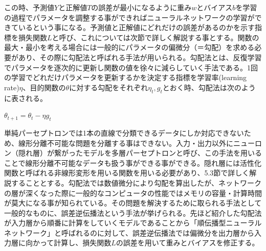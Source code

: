 \documentclass{article}
\begin{document}
この時、予測値\begin{math}Y\end{math}と正解値\begin{math}T\end{math}の誤差が最小になるように重み\begin{math}w\end{math}とバイアス\begin{math}b\end{math}を学習の過程でパラメータを調整する事ができればニューラルネットワークの学習ができているという事になる。予測値と正解値にどれだけの誤差があるのかを示す指標を損失関数\begin{math}L\end{math}と呼び、これについては次節で詳しく解説する事とする。関数の最大・最小を考える場合には一般的にパラメータの偏微分（＝勾配）を求める必要があり、その際に勾配法と呼ばれる手法が用いられる。勾配法とは、反復学習でパラメータを逐次的に更新し関数の値を徐々に減らしていく手法である。1回の学習でどれだけパラメータを更新するかを決定する指標を学習率(learning rate)\begin{math}\eta\end{math}、目的関数の\begin{math}\theta\end{math}に対する勾配をそれぞれ\begin{math}\eta_t,g_t\end{math}とおく時、勾配法は次のように表される。

\begin{center}
\begin{math}
\theta_{t+1} = \theta_t - \eta g_t
\end{math}
\end{center}

単純パーセプトロンでは1本の直線で分類できるデータにしか対応できないため、線形分離不可能な問題を分離する事はできない。入力・出力以外にニューロン（隠れ層）が繋がったモデルを多層パーセプトロンと呼び、この手法を用いることで線形分離不可能なデータも扱う事ができる事ができる。隠れ層には活性化関数と呼ばれる非線形変形を用いる関数を用いる必要があり、5.3節で詳しく解説することとする。勾配法では数値微分により勾配を算出したが、ネットワークの層が深くなった際に一般的なコンピュータの性能ではメモリの容量・計算時間が莫大になる事が知られている。その問題を解決するために取られる手法として一般的なものに、誤差逆伝播法という手法が挙げられる。先ほど紹介した勾配法が入力層から順番に計算をしていくモデルであることから「順伝播型ニューラルネットワーク」と呼ばれるのに対して、誤差逆伝播法では偏微分を出力層から入力層に向かって計算し、損失関数\begin{math}L\end{math}の誤差を用いて重みとバイアスを修正する。
\end{document}
